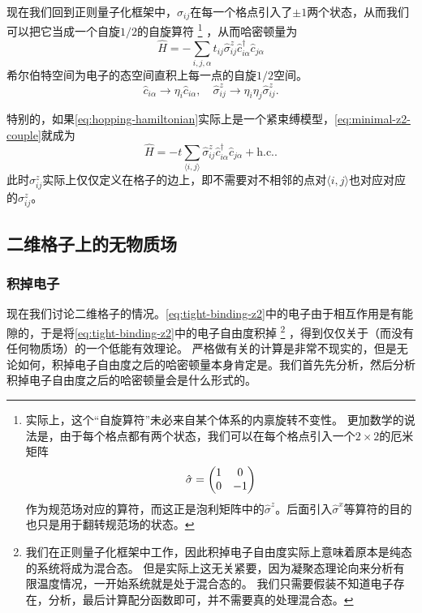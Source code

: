 \documentclass[hyperref, UTF8, a4paper]{ctexart}
\newcommand*{\pair}[1]{\langle #1 \rangle}
\newcommand*{\Ztwo}{$\mathbb{Z}_2$}
\begin{document}
现在我们回到正则量子化框架中，$\sigma_{ij}$在每一个格点引入了$\pm 1$两个状态，从而我们可以把它当成一个自旋$1/2$的自旋算符%
\footnote{实际上，这个“自旋算符”未必来自某个体系的内禀旋转不变性。
更加数学的说法是，由于每个格点都有两个状态，我们可以在每个格点引入一个$2\times 2$的厄米矩阵
\[
    \hat{\sigma} = \pmqty{1 & 0 \\ 0 & -1}
\]
作为规范场对应的算符，而这正是泡利矩阵中的$\hat{\sigma}^z$。后面引入$\hat{\sigma}^x$等算符的目的也只是用于翻转规范场的状态。
}%
，从而哈密顿量为
\begin{equation}
    \hat{H} = - \sum_{i, j, \alpha} t_{ij} \hat{\sigma}^z_{ij} \hat{c}_{i \alpha}^\dagger \hat{c}_{j \alpha}
    \label{eq:minimal-z2-couple}
\end{equation}
希尔伯特空间为电子的态空间直积上每一点的自旋$1/2$空间。
\begin{equation}
    \hat{c}_{i \alpha} \longrightarrow \eta_{i} \hat{c}_{i \alpha}, \quad \hat{\sigma}_{ij}^z \longrightarrow \eta_i \eta_j \hat{\sigma}_{ij}^z.
\end{equation}

特别的，如果\eqref{eq:hopping-hamiltonian}实际上是一个紧束缚模型，\eqref{eq:minimal-z2-couple}就成为
\begin{equation}
    \hat{H} = - t \sum_{\pair{i, j}} \hat{\sigma}^z_{ij} \hat{c}_{i \alpha}^\dagger \hat{c}_{j \alpha} + \text{h.c.}.
    \label{eq:tight-binding-z2}
\end{equation}
此时$\sigma_{ij}^z$实际上仅仅定义在格子的边上，即不需要对不相邻的点对$\pair{i, j}$也对应对应的$\sigma_{ij}^z$。

\subsection{二维格子上的无物质场}

\subsubsection{积掉电子}

现在我们讨论二维格子的情况。\eqref{eq:tight-binding-z2}中的电子由于相互作用是有能隙的，于是将\eqref{eq:tight-binding-z2}中的电子自由度积掉%
\footnote{我们在正则量子化框架中工作，因此积掉电子自由度实际上意味着原本是纯态的系统将成为混合态。
但是实际上这无关紧要，因为凝聚态理论向来分析有限温度情况，一开始系统就是处于混合态的。
我们只需要假装不知道电子存在，分析，最后计算配分函数即可，并不需要真的处理混合态。}%
，得到仅仅关于（而没有任何物质场）的一个低能有效理论。
严格做有关的计算是非常不现实的，但是无论如何，积掉电子自由度之后的哈密顿量本身肯定是。我们首先先分析，然后分析积掉电子自由度之后的哈密顿量会是什么形式的。
\end{document}
